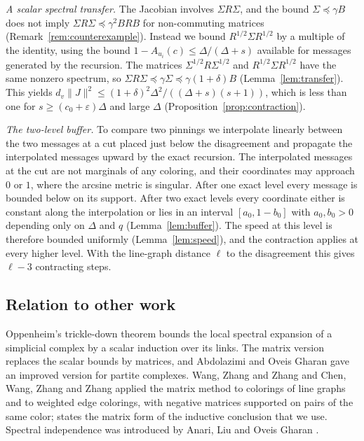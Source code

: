 \documentclass{amsart}
\numberwithin{equation}{section}
\theoremstyle{plain}
\theoremstyle{definition}
\theoremstyle{remark}
\begin{document}
\emph{A scalar spectral transfer.} The Jacobian involves $\Sigma R\Sigma$, and the bound $\Sigma\preceq\gamma B$ does not imply $\Sigma R\Sigma\preceq\gamma^2BRB$ for non-commuting matrices (Remark~\ref{rem:counterexample}). Instead we bound $R^{1/2}\Sigma R^{1/2}$ by a multiple of the identity, using the bound $1-A_{u_i}(c)\le\Delta/(\Delta+s)$ available for messages generated by the recursion. The matrices $\Sigma^{1/2}R\Sigma^{1/2}$ and $R^{1/2}\Sigma R^{1/2}$ have the same nonzero spectrum, so $\Sigma R\Sigma\preceq\gamma\Sigma\preceq\gamma(1+\delta)B$ (Lemma~\ref{lem:transfer}). This yields $d_v\|J\|^2\le(1+\delta)^2\Delta^2/((\Delta+s)(s+1))$, which is less than one for $s\ge(c_0+\varepsilon)\Delta$ and large $\Delta$ (Proposition~\ref{prop:contraction}).

\emph{The two-level buffer.} To compare two pinnings we interpolate linearly between the two messages at a cut placed just below the disagreement and propagate the interpolated messages upward by the exact recursion. The interpolated messages at the cut are not marginals of any coloring, and their coordinates may approach $0$ or $1$, where the arcsine metric is singular. After one exact level every message is bounded below on its support. After two exact levels every coordinate either is constant along the interpolation or lies in an interval $[a_0,1-b_0]$ with $a_0,b_0>0$ depending only on $\Delta$ and $q$ (Lemma~\ref{lem:buffer}). The speed at this level is therefore bounded uniformly (Lemma~\ref{lem:speed}), and the contraction applies at every higher level. With the line-graph distance $\ell$ to the disagreement this gives $\ell-3$ contracting steps.

\subsection{Relation to other work}

Oppenheim's trickle-down theorem \cite{Opp} bounds the local spectral expansion of a simplicial complex by a scalar induction over its links. The matrix version \cite{ALG} replaces the scalar bounds by matrices, and Abdolazimi and Oveis Gharan \cite{AO} gave an improved version for partite complexes. Wang, Zhang and Zhang \cite{WZZ} and Chen, Wang, Zhang and Zhang \cite{CWZZ} applied the matrix method to colorings of line graphs and to weighted edge colorings, with negative matrices supported on pairs of the same color; \cite[Proposition~49]{CWZZ} states the matrix form of the inductive conclusion that we use. Spectral independence was introduced by Anari, Liu and Oveis Gharan \cite{ALO}.
\end{document}
